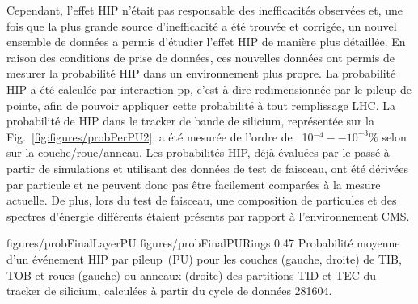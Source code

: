
Cependant, l'effet HIP n'était pas responsable des inefficacités observées et, une fois que la plus grande source d'inefficacité a été trouvée et corrigée, un nouvel ensemble de données a permis d'étudier l'effet HIP de manière plus détaillée. En raison des conditions de prise de données, ces nouvelles données ont permis de mesurer la probabilité HIP dans un environnement plus propre. La probabilité HIP a été calculée par interaction pp, c'est-à-dire redimensionnée par le pileup de pointe, afin de pouvoir appliquer cette probabilité à tout remplissage LHC. La probabilité de HIP dans le tracker de bande de silicium, représentée sur la Fig.~\ref{fig:figures/probPerPU2}, a été mesurée de l'ordre de ~10$^{-4} -- 10^{-3}$\% selon sur la couche/roue/anneau. Les probabilités HIP, déjà évaluées par le passé à partir de simulations et utilisant des données de test de faisceau, ont été dérivées par particule et ne peuvent donc pas être facilement comparées à la mesure actuelle. De plus, lors du test de faisceau, une composition de particules et des spectres d'énergie différents étaient présents par rapport à l'environnement CMS.

                 {figures/probFinalLayerPU} %
                 {figures/probFinalPURings} %
                 {0.47}       %
                 { Probabilité moyenne d'un événement HIP par pileup~(PU) pour les couches (gauche, droite) de TIB, TOB et roues (gauche) ou anneaux (droite) des partitions TID et TEC du tracker de silicium, calculées à partir du cycle de données 281604.}


